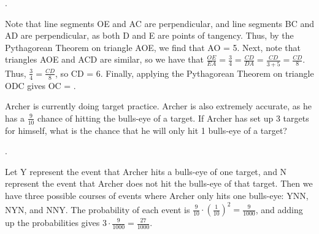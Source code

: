 \documentclass[11pt]{article}
\begin{document}
\begin{answer}
.
\end{answer}

\begin{solution}
Note that line segments OE and AC are perpendicular, and line segments BC and AD are perpendicular, as both D and E are points of tangency. Thus, by the Pythagorean Theorem on triangle AOE, we find that AO = 5. Next, note that triangles AOE and ACD are similar, so we have that $\frac{OE}{EA} = \frac{3}{4} = \frac{CD}{DA} = \frac{CD}{3+5} = \frac{CD}{8}$. Thus, $\frac{3}{4} = \frac{CD}{8}$, so CD = 6. Finally, applying the Pythagorean Theorem on triangle ODC gives OC = .
\end{solution}

\begin{problem}
Archer is currently doing target practice. Archer is also extremely accurate, as he has a $\frac{9}{10}$ chance of hitting the bulls-eye of a target. If Archer has set up 3 targets for himself, what is the chance that he will only hit 1 bulls-eye of a target?
\end{problem}

\begin{answer}
.
\end{answer}

\begin{solution}
Let Y represent the event that Archer hits a bulls-eye of one target, and N represent the event that Archer does not hit the bulls-eye of that target. Then we have three possible courses of events where Archer only hits one bulls-eye: YNN, NYN, and NNY. The probability of each event is $\frac{9}{10}\cdot(\frac{1}{10})^2 = \frac{9}{1000}$, and adding up the probabilities gives $3\cdot\frac{9}{1000} = \boxed{\frac{27}{1000}}$.
\end{solution}
\end{document}
